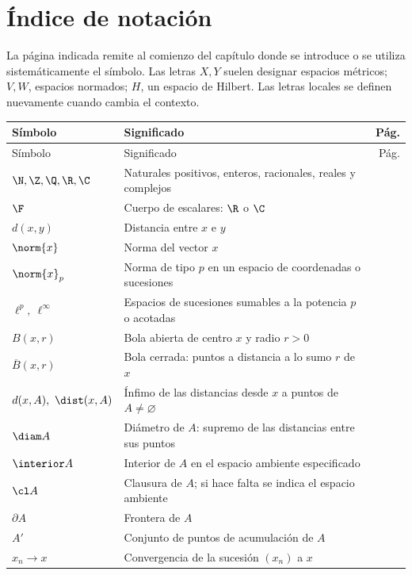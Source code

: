 \chapter{Índice de notación}
La página indicada remite al comienzo del capítulo donde se introduce o se utiliza sistemáticamente el símbolo. Las letras $X,Y$ suelen designar espacios métricos; $V,W$, espacios normados; $H$, un espacio de Hilbert. Las letras locales se definen nuevamente cuando cambia el contexto.
\small
\begin{longtable}{@{}p{}p{}r@{}}
\toprule
Símbolo & Significado & Pág.\\
\midrule
\endfirsthead
\toprule Símbolo & Significado & Pág.\\\midrule
\endhead
\bottomrule\endfoot
$\N,\Z,\Q,\R,\C$ & Naturales positivos, enteros, racionales, reales y complejos & \pageref{chap:01}\\
$\F$ & Cuerpo de escalares: $\R$ o $\C$ & \pageref{chap:01}\\
$d(x,y)$ & Distancia entre $x$ e $y$ & \pageref{chap:01}\\
$\norm{x}$ & Norma del vector $x$ & \pageref{chap:01}\\
$\norm{x}_p$ & Norma de tipo $p$ en un espacio de coordenadas o sucesiones & \pageref{chap:01}\\
$\ell^p,\ \ell^\infty$ & Espacios de sucesiones sumables a la potencia $p$ o acotadas & \pageref{chap:01}\\
$B(x,r)$ & Bola abierta de centro $x$ y radio $r>0$ & \pageref{chap:02}\\
$\overline B(x,r)$ & Bola cerrada: puntos a distancia a lo sumo $r$ de $x$ & \pageref{chap:02}\\
$d(x,A),\ \dist(x,A)$ & Ínfimo de las distancias desde $x$ a puntos de $A\ne\varnothing$ & \pageref{chap:03}\\
$\diam A$ & Diámetro de $A$: supremo de las distancias entre sus puntos & \pageref{chap:02}\\
$\interior A$ & Interior de $A$ en el espacio ambiente especificado & \pageref{chap:02}\\
$\cl A$ & Clausura de $A$; si hace falta se indica el espacio ambiente & \pageref{chap:02}\\
$\partial A$ & Frontera de $A$ & \pageref{chap:05}\\
$A'$ & Conjunto de puntos de acumulación de $A$ & \pageref{chap:03}\\
$x_n\to x$ & Convergencia de la sucesión $(x_n)$ a $x$ & \pageref{chap:03}\\

\end{longtable}

